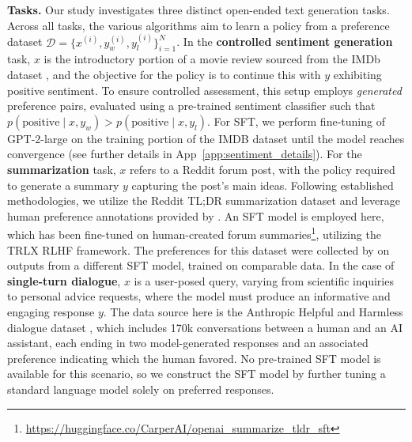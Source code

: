 \textbf{Tasks.} Our study investigates three distinct open-ended text generation tasks. Across all tasks, the various algorithms aim to learn a policy from a preference dataset $\mathcal{D}=\bigl\{x^{(i)}, y_w^{(i)}, y_l^{(i)}\bigr\}_{i=1}^N$. In the \textbf{controlled sentiment generation} task, $x$ is the introductory portion of a movie review sourced from the IMDb dataset \cite{maas-EtAl:2011:ACL-HLT2011}, and the objective for the policy is to continue this with $y$ exhibiting positive sentiment. To ensure controlled assessment, this setup employs \textit{generated} preference pairs, evaluated using a pre-trained sentiment classifier such that $p(\text{positive}\mid x,y_w)>p(\text{positive}\mid x,y_l)$. For SFT, we perform fine-tuning of GPT-2-large on the training portion of the IMDB dataset until the model reaches convergence (see further details in App~\ref{app:sentiment_details}). For the \textbf{summarization} task, $x$ refers to a Reddit forum post, with the policy required to generate a summary $y$ capturing the post’s main ideas. Following established methodologies, we utilize the Reddit TL;DR summarization dataset \citep{volske-etal-2017-tl} and leverage human preference annotations provided by \citeauthor{stiennon2022learning}. An SFT model is employed here, which has been fine-tuned on human-created forum summaries\footnote{\url{https://huggingface.co/CarperAI/openai_summarize_tldr_sft}}, utilizing the TRLX \citep{leandro_von_werra_2023_7790115} RLHF framework. The preferences for this dataset were collected by \citeauthor{stiennon2022learning} on outputs from a different SFT model, trained on comparable data. In the case of \textbf{single-turn dialogue}, $x$ is a user-posed query, varying from scientific inquiries to personal advice requests, where the model must produce an informative and engaging response $y$. The data source here is the Anthropic Helpful and Harmless dialogue dataset \citep{bai2022training}, which includes 170k conversations between a human and an AI assistant, each ending in two model-generated responses and an associated preference indicating which the human favored. No pre-trained SFT model is available for this scenario, so we construct the SFT model by further tuning a standard language model solely on preferred responses.

